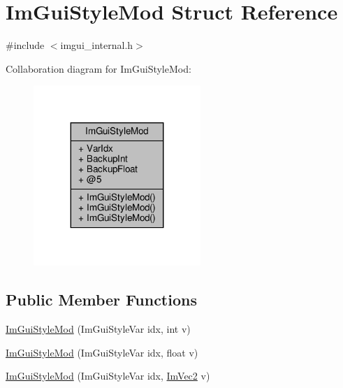 \hypertarget{structImGuiStyleMod}{}\section{Im\+Gui\+Style\+Mod Struct Reference}
\label{structImGuiStyleMod}


{\ttfamily \#include $<$imgui\+\_\+internal.\+h$>$}



Collaboration diagram for Im\+Gui\+Style\+Mod\+:
\nopagebreak
\begin{figure}[H]
\begin{center}
\leavevmode
\includegraphics[width=179pt]{structImGuiStyleMod__coll__graph}
\end{center}
\end{figure}
\subsection*{Public Member Functions}
\begin{DoxyCompactItemize}
\item 
\hyperlink{structImGuiStyleMod_ae9987273b247f021020034256364bec8}{Im\+Gui\+Style\+Mod} (Im\+Gui\+Style\+Var idx, int v)
\item 
\hyperlink{structImGuiStyleMod_a737c3fad802a8d5d4616f9decc7e402d}{Im\+Gui\+Style\+Mod} (Im\+Gui\+Style\+Var idx, float v)
\item 
\hyperlink{structImGuiStyleMod_a28647cc4ab8b95b8ee30e0fc7401ae07}{Im\+Gui\+Style\+Mod} (Im\+Gui\+Style\+Var idx, \hyperlink{structImVec2}{Im\+Vec2} v)
\end{DoxyCompactItemize}
